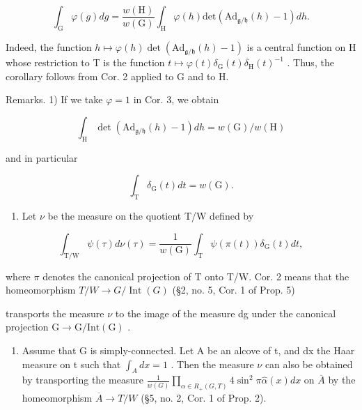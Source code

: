 \[
\int_ {\mathrm{G}} \varphi (g) d g = \frac {w (\mathrm{H})}{w (\mathrm{G})} \int_ {\mathrm{H}} \varphi (h) \mathrm{det} (\mathrm{Ad} _ {\mathfrak {g} / \mathfrak {h}} (h) - 1) d h.\tag{7}
\]

Indeed, the function \(h \mapsto \varphi(h) \det(\mathrm{Ad}_{\mathfrak{g}/\mathfrak{h}}(h) - 1)\) is a central function on H whose restriction to T is the function \(t \mapsto \varphi(t) \delta_{\mathrm{G}}(t) \delta_{\mathrm{H}}(t)^{-1}\) . Thus, the corollary follows from Cor. 2 applied to G and to H.

Remarks. 1) If we take \(\varphi = 1\) in Cor. 3, we obtain

\[
\int_ {\mathrm{H}} \det (\mathrm{Ad} _ {\mathfrak {g} / \mathfrak {h}} (h) - 1) d h = w (\mathrm{G}) / w (\mathrm{H})\tag{8}
\]

and in particular

\[
\int_ {\mathrm{T}} \delta_ {\mathrm{G}} (t) d t = w (\mathrm{G}).\tag{9}
\]

\begin{enumerate}
\def\labelenumi{\arabic{enumi})}
\setcounter{enumi}{1}
\tightlist
\item
  Let \(\nu\) be the measure on the quotient T/W defined by
\end{enumerate}

\[
\int_ {\mathrm{T/W}} \psi (\tau) d \nu (\tau) = \frac {1}{w (\mathrm{G})} \int_ {\mathrm{T}} \psi (\pi (t)) \delta_ {\mathrm{G}} (t) d t,
\]

where \(\pi\) denotes the canonical projection of T onto T/W. Cor. 2 means that the homeomorphism \(T / W \to G / \operatorname{Int}(G)\) (§2, no. 5, Cor. 1 of Prop. 5)

transports the measure \(\nu\) to the image of the measure dg under the canonical projection \(\mathrm{G} \rightarrow \mathrm{G}/\mathrm{Int}(\mathrm{G})\) .

\begin{enumerate}
\def\labelenumi{\arabic{enumi})}
\setcounter{enumi}{2}
\tightlist
\item
  Assume that G is simply-connected. Let A be an alcove of t, and dx the Haar measure on t such that \(\int_{A} dx = 1\) . Then the measure \(\nu\) can also be obtained by transporting the measure \(\frac{1}{w(G)} \prod_{\alpha \in R_{+}(G,T)} 4 \sin^{2} \pi \hat{\alpha}(x) dx\) on \(\overline{A}\) by the homeomorphism \(\overline{A} \rightarrow T/W\) (§5, no. 2, Cor. 1 of Prop. 2).
\end{enumerate}


